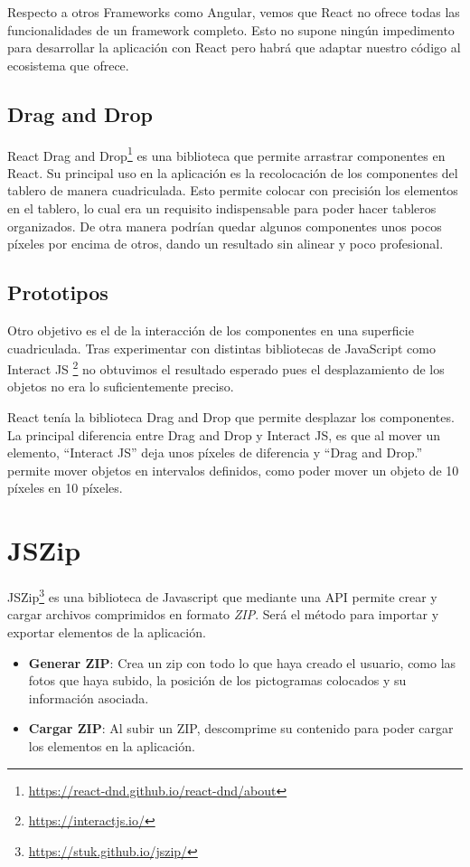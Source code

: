 Respecto a otros Frameworks como Angular, vemos que React no ofrece todas las funcionalidades de un framework completo. Esto no supone ningún impedimento para desarrollar la aplicación con React pero habrá que adaptar nuestro código al ecosistema que ofrece.



\subsection{Drag and Drop}
\label{cap3:sec:draganddrop}
React Drag and Drop\footnote{\url{https://react-dnd.github.io/react-dnd/about}} es una biblioteca que permite arrastrar componentes en React. Su principal uso en la aplicación es la recolocación de los componentes del tablero de manera cuadriculada. Esto permite colocar con precisión los elementos en el tablero, lo cual era un requisito indispensable para poder hacer tableros organizados. De otra manera podrían quedar algunos componentes unos pocos píxeles por encima de otros, dando un resultado sin alinear y poco profesional.

\subsection{Prototipos}
\label{cap3:sec:prototipos}
Otro objetivo es el de la interacción de los componentes en una superficie cuadriculada. Tras experimentar con distintas bibliotecas de JavaScript como Interact JS \footnote{\url{https://interactjs.io/}} no obtuvimos el resultado esperado pues el desplazamiento de los objetos no era lo suficientemente preciso.

React tenía la biblioteca Drag and Drop que permite desplazar los componentes. La principal diferencia entre Drag and Drop y Interact JS, es que al mover un elemento, “Interact JS”  deja unos píxeles de diferencia y “Drag and Drop.” permite mover objetos en intervalos definidos, como poder mover un objeto de 10 píxeles en 10 píxeles.

\section{JSZip}
\label{cap3:sec:jszip}
JSZip\footnote{\url{https://stuk.github.io/jszip/}} es una biblioteca de Javascript que mediante una API permite crear y cargar archivos comprimidos en formato \textit{ZIP}. Será el método para importar y exportar elementos de la aplicación.
\begin{itemize}
	\item \textbf{Generar ZIP}: Crea un zip con todo lo que haya creado el usuario, como las fotos que haya subido, la posición de los pictogramas colocados y su información asociada.
	\item \textbf{Cargar ZIP}: Al subir un ZIP, descomprime su contenido para poder cargar los elementos en la aplicación.
\end{itemize}	


